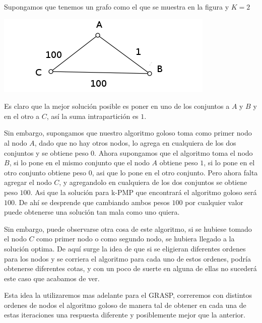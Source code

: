 Supongamos que tenemos un grafo como el que se muestra en la figura y $K = 2$

\includegraphics[scale=0.5]{Ej3/grafo.png}

Es claro que la mejor solución posible es poner en uno de los conjuntos a $A$ y $B$ y en el otro a $C$, así la suma intrapartición es $1$.

Sin embargo, supongamos que nuestro algoritmo goloso toma como primer nodo al nodo $A$, dado que no hay otros nodos, lo agrega en cualquiera de los dos conjuntos y se obtiene peso $0$. Ahora supongamos que el algoritmo toma el nodo $B$, si lo pone en el mismo conjunto que el nodo $A$ obtiene peso $1$, si lo pone en el otro conjunto obtiene peso $0$, asi que lo pone en el otro conjunto. Pero ahora falta agregar el nodo $C$, y agregandolo en cualquiera de los dos conjuntos se obtiene peso $100$. Asi que la solución para k-PMP que encontrará el algoritmo goloso será $100$.
De ahí se desprende que cambiando ambos pesos $100$ por cualquier valor puede obtenerse una solución tan mala como uno quiera.

Sin embargo, puede observarse otra cosa de este algoritmo, si se hubiese tomado el nodo $C$ como primer nodo o como segundo nodo, se hubiera llegado a la solución optima. De aquí surge la idea de que si se eligieran diferentes ordenes para los nodos y se corriera el algoritmo para cada uno de estos ordenes, podría obtenerse diferentes cotas, y con un poco de suerte en alguna de ellas no sucederá este caso que acabamos de ver.

Esta idea la utilizaremos mas adelante para el GRASP, correremos con distintos ordenes de nodos el algoritmo goloso de manera tal de obtener en cada una de estas iteraciones una respuesta diferente y posiblemente mejor que la anterior.